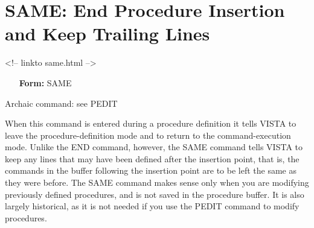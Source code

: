 \section{SAME: End Procedure Insertion and Keep Trailing Lines}
\begin{rawhtml}
<!-- linkto same.html -->
\end{rawhtml}

\begin{itemize} 
  \item[\textbf{Form: } SAME\hfill]{}
\end{itemize}

Archaic command: see PEDIT

When this command is entered during a procedure definition it tells VISTA
to leave the procedure-definition mode and to return to the
command-execution mode.  Unlike the END command, however, the SAME command
tells VISTA to keep any lines that may have been defined after the
insertion point, that is, the commands in the buffer following the
insertion point are to be left the same as they were before.  The SAME
command makes sense only when you are modifying previously defined
procedures, and is not saved in the procedure buffer. It is also largely
historical, as it is not needed if you use the PEDIT command to modify
procedures.

